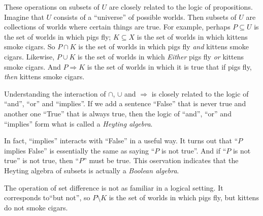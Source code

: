 These operations on subsets of $U$ are closely related to the logic of propositions.
Imagine that $U$ consists of a ``universe'' of possible worlds. Then subsets of $U$ are collections of worlds where certain things are true.
For example, perhaps $P\subseteq U$ is the set of worlds in which pigs fly;
$K\subseteq X$ is the set of worlds in which kittens smoke cigars.
So $P\cap K$ is the set of worlds in which pigs fly \emph{and} kittens smoke cigars.
Likewise, $P\cup K$ is the set of worlds in which \emph{Either} pigs fly \emph{or} kittens smoke cigars.
And $P\Rightarrow K$ is the set of worlds in which it is true that if pigs fly, \emph{then} kittens smoke cigars. 

Understanding the interaction of $\cap$, $\cup$ and $\Rightarrow$ is closely related to the logic of ``and'', ``or'' and ``implies''. If we add a sentence ``False'' that is never true and another one ``True'' that is always true, then the logic of ``and'', ``or'' and ``implies'' form what is called a \emph{Heyting algebra}.

In fact, ``implies'' interacts with ``False'' in a useful way.
It turns out that ``$P$ implies False'' is essentially the same as saying ``$P$ is not true''. And if ``$P$ is not true'' is not true, then ``$P$'' must be true. This oservation indicates that the Heyting algebra of subsets is actually a \emph{Boolean algebra}.

The operation of set difference is not as familiar in a logical setting. 
It corresponds to``but not'', so $P\setminus K$ is the set of worlds  in which pigs fly, but kittens do not smoke cigars. 
 
%
%


